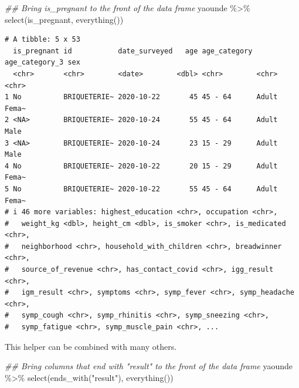 \documentclass[
  letterpaper,
  DIV=11,
  numbers=noendperiod]{scrreprt}
\newenvironment{Shaded}{\begin{snugshade}}{\end{snugshade}}
\newcommand{\DocumentationTok}[1]{\textcolor[rgb]{0.37,0.37,0.37}{\textit{#1}}}
\newcommand{\FunctionTok}[1]{\textcolor[rgb]{0.28,0.35,0.67}{#1}}
\newcommand{\NormalTok}[1]{\textcolor[rgb]{0.00,0.23,0.31}{#1}}
\newcommand{\SpecialCharTok}[1]{\textcolor[rgb]{0.37,0.37,0.37}{#1}}
\newcommand{\StringTok}[1]{\textcolor[rgb]{0.13,0.47,0.30}{#1}}
\begin{document}
\begin{Shaded}
\begin{Highlighting}[]
\DocumentationTok{\#\# Bring \textasciigrave{}is\_pregnant\textasciigrave{} to the front of the data frame}
\NormalTok{yaounde }\SpecialCharTok{\%\textgreater{}\%} \FunctionTok{select}\NormalTok{(is\_pregnant, }\FunctionTok{everything}\NormalTok{())}
\end{Highlighting}
\end{Shaded}

\begin{verbatim}
# A tibble: 5 x 53
  is_pregnant id           date_surveyed   age age_category age_category_3 sex  
  <chr>       <chr>        <date>        <dbl> <chr>        <chr>          <chr>
1 No          BRIQUETERIE~ 2020-10-22       45 45 - 64      Adult          Fema~
2 <NA>        BRIQUETERIE~ 2020-10-24       55 45 - 64      Adult          Male 
3 <NA>        BRIQUETERIE~ 2020-10-24       23 15 - 29      Adult          Male 
4 No          BRIQUETERIE~ 2020-10-22       20 15 - 29      Adult          Fema~
5 No          BRIQUETERIE~ 2020-10-22       55 45 - 64      Adult          Fema~
# i 46 more variables: highest_education <chr>, occupation <chr>,
#   weight_kg <dbl>, height_cm <dbl>, is_smoker <chr>, is_medicated <chr>,
#   neighborhood <chr>, household_with_children <chr>, breadwinner <chr>,
#   source_of_revenue <chr>, has_contact_covid <chr>, igg_result <chr>,
#   igm_result <chr>, symptoms <chr>, symp_fever <chr>, symp_headache <chr>,
#   symp_cough <chr>, symp_rhinitis <chr>, symp_sneezing <chr>,
#   symp_fatigue <chr>, symp_muscle_pain <chr>, ...
\end{verbatim}

This helper can be combined with many others.

\begin{Shaded}
\begin{Highlighting}[]
\DocumentationTok{\#\# Bring columns that end with "result" to the front of the data frame}
\NormalTok{yaounde }\SpecialCharTok{\%\textgreater{}\%} \FunctionTok{select}\NormalTok{(}\FunctionTok{ends\_with}\NormalTok{(}\StringTok{"result"}\NormalTok{), }\FunctionTok{everything}\NormalTok{())}
\end{Highlighting}
\end{Shaded}
\end{document}
